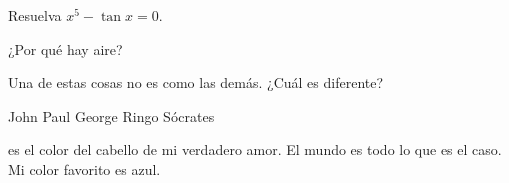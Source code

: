 \documentclass[addpoints,answers]{exam}
\newcommand{\tf}[1][{}]{\fillin[#1][0.25in]}
\begin{document}
\begin{center}
\end{center}
\vspace{0.1in}
\vspace{0.2in}

\begin{questions}
\question[5] Resuelva $x^{5}-\tan x=0$.\smallskip\fillwithgrid{1in}

\question
{}

\bonusquestion[5] ¿Por qué hay aire? \fillwithdottedlines{1in}

\question Una de estas cosas no es como las demás. ¿Cuál es diferente?
\begin{oneparcheckboxes}
\choice John \choice Paul \choice George \choice Ringo \choice Sócrates
\end{oneparcheckboxes}

\question\fillin[Negro] es el color del cabello de mi verdadero amor.
\question\tf[V] El mundo es todo lo que es el caso.
\question\tf[F] Mi color favorito es azul.
\end{questions}
\end{document}
